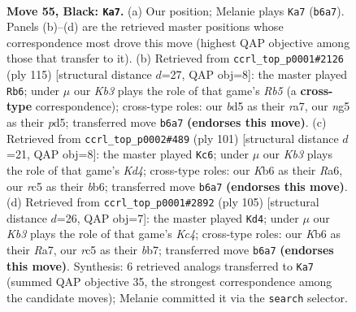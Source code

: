 \documentclass[11pt]{article}
\begin{document}
\clearpage

\begin{figure}[p]\centering
\begin{subfigure}{0.46\textwidth}\centering
\resizebox{\linewidth}{!}{%
\newchessgame
\chessboard[
  setfen={3r4/8/1k6/2RB1pNN/1P6/1K1b4/6P1/8 b - - 7 55},
  showmover=false,
  pgfstyle=straightmove, color=movearrow, markmove={b6-a7}
]}
\caption{}
\end{subfigure}\hfill
\begin{subfigure}{0.46\textwidth}\centering
\resizebox{\linewidth}{!}{%
\newchessgame
\chessboard[
  setfen={3k4/R7/3p4/3Pb3/1rB5/1P1K4/8/8 b - - 20 58},
  showmover=false,
  pgfstyle=straightmove, color=movearrow, markmove={b4-b6}
]}
\caption{}
\end{subfigure}
\\[4pt]
\begin{subfigure}{0.46\textwidth}\centering
\resizebox{\linewidth}{!}{%
\newchessgame
\chessboard[
  setfen={8/8/rB4p1/3k4/1R6/2P1K3/2b2P2/8 b - - 17 51},
  showmover=false,
  pgfstyle=straightmove, color=movearrow, markmove={d5-c6}
]}
\caption{}
\end{subfigure}\hfill
\begin{subfigure}{0.46\textwidth}\centering
\resizebox{\linewidth}{!}{%
\newchessgame
\chessboard[
  setfen={8/rB6/8/2k5/7p/6bP/4K1P1/1R6 b - - 1 53},
  showmover=false,
  pgfstyle=straightmove, color=movearrow, markmove={c5-d4}
]}
\caption{}
\end{subfigure}
\caption{\textbf{Move 55, Black: \texttt{Ka7}.} (a) Our position; Melanie plays \texttt{Ka7} (\texttt{b6a7}). Panels (b)--(d) are the retrieved master positions whose correspondence most drove this move (highest QAP objective among those that transfer to it). (b) Retrieved from \texttt{ccrl\_top\_p0001\#2126} (ply 115) [structural distance $d$=27, QAP obj=8]: the master played \texttt{Rb6}; under $\mu$ our \emph{Kb3} plays the role of that game's \emph{Rb5} (a \textbf{cross-type} correspondence); cross-type roles: our \emph{b}d5 as their \emph{r}a7, our \emph{n}g5 as their \emph{p}d5; transferred move \texttt{b6a7} \textbf{(endorses this move)}. (c) Retrieved from \texttt{ccrl\_top\_p0002\#489} (ply 101) [structural distance $d$=21, QAP obj=8]: the master played \texttt{Kc6}; under $\mu$ our \emph{Kb3} plays the role of that game's \emph{Kd4}; cross-type roles: our \emph{K}b6 as their \emph{R}a6, our \emph{r}c5 as their \emph{b}b6; transferred move \texttt{b6a7} \textbf{(endorses this move)}. (d) Retrieved from \texttt{ccrl\_top\_p0001\#2892} (ply 105) [structural distance $d$=26, QAP obj=7]: the master played \texttt{Kd4}; under $\mu$ our \emph{Kb3} plays the role of that game's \emph{Kc4}; cross-type roles: our \emph{K}b6 as their \emph{R}a7, our \emph{r}c5 as their \emph{b}b7; transferred move \texttt{b6a7} \textbf{(endorses this move)}. Synthesis: 6 retrieved analogs transferred to \texttt{Ka7} (summed QAP objective 35, the strongest correspondence among the candidate moves); Melanie committed it via the \texttt{search} selector.}
\label{fig:thought-m109}
\end{figure}
\end{document}
